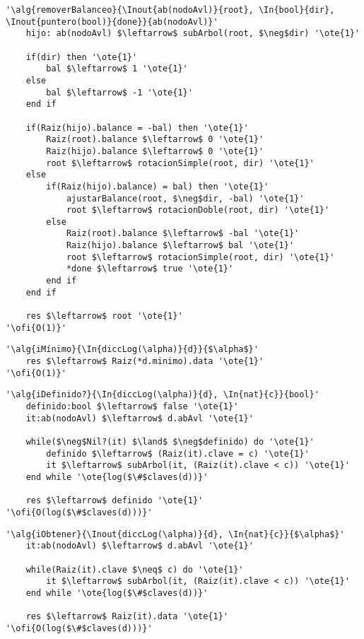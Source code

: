 \begin{lstlisting}[mathescape]
'\alg{removerBalanceo}{\Inout{ab(nodoAvl)}{root}, \In{bool}{dir}, \Inout{puntero(bool)}{done}}{ab(nodoAvl)}'
	hijo: ab(nodoAvl) $\leftarrow$ subArbol(root, $\neg$dir) '\ote{1}'

	if(dir) then '\ote{1}'
		bal $\leftarrow$ 1 '\ote{1}'
	else
		bal $\leftarrow$ -1 '\ote{1}'
	end if

	if(Raiz(hijo).balance = -bal) then '\ote{1}'
		Raiz(root).balance $\leftarrow$ 0 '\ote{1}'
		Raiz(hijo).balance $\leftarrow$ 0 '\ote{1}'
		root $\leftarrow$ rotacionSimple(root, dir) '\ote{1}'
	else
		if(Raiz(hijo).balance) = bal) then '\ote{1}'
			ajustarBalance(root, $\neg$dir, -bal) '\ote{1}'
			root $\leftarrow$ rotacionDoble(root, dir) '\ote{1}'
		else
			Raiz(root).balance $\leftarrow$ -bal '\ote{1}'
			Raiz(hijo).balance $\leftarrow$ bal '\ote{1}'
			root $\leftarrow$ rotacionSimple(root, dir) '\ote{1}'
			*done $\leftarrow$ true '\ote{1}'
		end if
	end if

	res $\leftarrow$ root '\ote{1}'
'\ofi{O(1)}'
\end{lstlisting}

\begin{lstlisting}[mathescape]
'\alg{iMínimo}{\In{diccLog(\alpha)}{d}}{$\alpha$}'
	res $\leftarrow$ Raiz(*d.minimo).data '\ote{1}'
'\ofi{O(1)}'
\end{lstlisting}

\begin{lstlisting}[mathescape]
'\alg{iDefinido?}{\In{diccLog(\alpha)}{d}, \In{nat}{c}}{bool}'
	definido:bool $\leftarrow$ false '\ote{1}'
	it:ab(nodoAvl) $\leftarrow$ d.abAvl '\ote{1}'

	while($\neg$Nil?(it) $\land$ $\neg$definido) do '\ote{1}'
		definido $\leftarrow$ (Raiz(it).clave = c) '\ote{1}'
		it $\leftarrow$ subArbol(it, (Raiz(it).clave < c)) '\ote{1}'
	end while '\ote{log($\#$claves(d))}'

	res $\leftarrow$ definido '\ote{1}'
'\ofi{O(log($\#$claves(d)))}'
\end{lstlisting}

\pagebreak

\begin{lstlisting}[mathescape]
'\alg{iObtener}{\Inout{diccLog(\alpha)}{d}, \In{nat}{c}}{$\alpha$}'
	it:ab(nodoAvl) $\leftarrow$ d.abAvl '\ote{1}'

	while(Raiz(it).clave $\neq$ c) do '\ote{1}'
		it $\leftarrow$ subArbol(it, (Raiz(it).clave < c)) '\ote{1}'
	end while '\ote{log($\#$claves(d))}'

	res $\leftarrow$ Raiz(it).data '\ote{1}'
'\ofi{O(log($\#$claves(d)))}'
\end{lstlisting}

